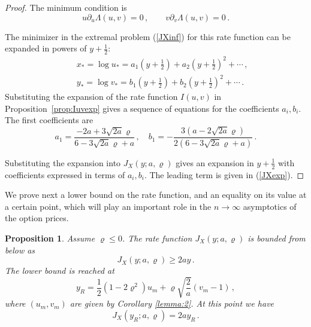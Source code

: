 \documentclass[11pt]{article}
\numberwithin{equation}{section}
\theoremstyle{plain}
\newtheorem{proposition}[theorem]{Proposition}
\begin{document}
\begin{proof}
The minimum condition is
\begin{equation}
u \partial_u \Lambda(u,v) = 0\,,\qquad 
v \partial_v \Lambda(u,v) = 0\,.
\end{equation}

The minimizer in the extremal problem (\ref{JXinf}) 
for this rate function can be expanded in powers of $y+\frac12$:
\begin{eqnarray}
&& x_* = \log u_* = a_1 \left(y+\frac12\right) + a_2 \left(y+\frac12\right)^2 + \cdots\,, \\
&& y_* = \log v_* = b_1 \left(y+\frac12\right) + b_2 \left(y+\frac12\right)^2 + \cdots\,. 
\end{eqnarray}
Substituting the expansion of the rate function $I(u,v)$ in Proposition~\ref{prop:Iuvexp} 
gives a sequence of equations for the coefficients $a_i,b_i$. The first coefficients are
\begin{equation}
a_1 = \frac{-2a + 3\sqrt{2a} \varrho}{6 - 3\sqrt{2a} \varrho + a}\,,\quad
b_1 = -\frac{3(a - 2\sqrt{2a} \varrho)}{2(6 - 3\sqrt{2a} \varrho + a)}\,.
\end{equation}

Substituting the expansion into $J_X(y;a,\varrho)$ gives an expansion in
$y+\frac12$ with coefficients expressed in terms of $a_i,b_i$. The leading term
is given in (\ref{JXexp}).

\end{proof}


We prove next a lower bound on the rate function, and an equality on its 
value at a certain point, which will play an important 
role in the $n\to \infty$ asymptotics of the option prices.

\begin{proposition}
Assume $\varrho \leq 0$. The rate function $J_X(y;a,\varrho)$ is bounded from below as
\begin{equation}\label{JXlowbound}
J_X(y; a, \varrho) \geq 2 ay\,.
\end{equation}
The lower bound is reached at 
\begin{equation}\label{yRdef}
y_R = \frac12 \left(1-2\varrho^2\right) u_m + \varrho \sqrt{\frac{2}{a}} (v_m-1)\,,
\end{equation}
where $(u_m,v_m)$ are given by Corollary \ref{lemma:2}. At this point we have
\begin{equation}\label{zeroR}
J_X(y_R; a, \varrho) = 2 ay_R \,. 
\end{equation}
\end{proposition}
\end{document}
